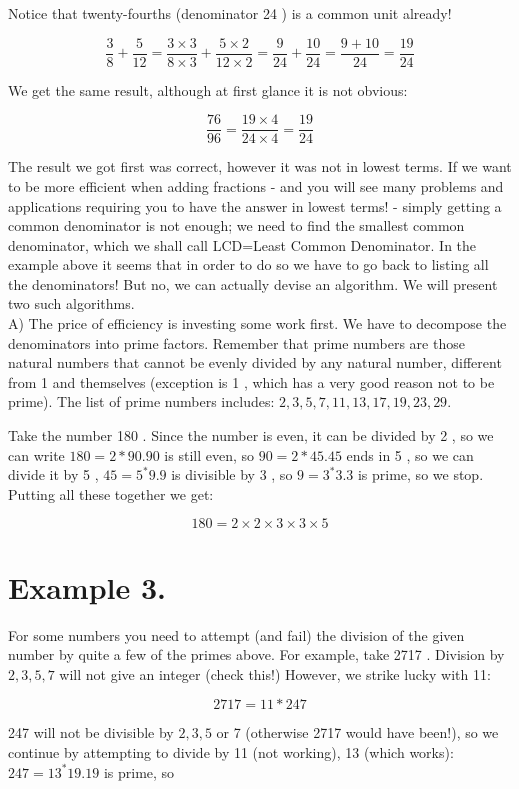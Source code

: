 \documentclass{ximera}
\begin{document}
Notice that twenty-fourths (denominator 24 ) is a common unit already!

$$\frac{3}{8}+\frac{5}{12}=\frac{3 \times 3}{8 \times 3}+\frac{5 \times 2}{12 \times 2}=\frac{9}{24}+\frac{10}{24}=\frac{9+10}{24}=\frac{19}{24}$$

We get the same result, although at first glance it is not obvious:

$$\frac{76}{96}=\frac{19 \times 4}{24 \times 4}=\frac{19}{24}$$

The result we got first was correct, however it was not in lowest terms. If we want to be more efficient when adding fractions - and you will see many problems and applications requiring you to have the answer in lowest terms! - simply getting a common denominator is not enough; we need to find the smallest common denominator, which we shall call LCD=Least Common Denominator. In the example above it seems that in order to do so we have to go back to listing all the denominators! But no, we can actually devise an algorithm. We will present two such algorithms.\\
A) The price of efficiency is investing some work first. We have to decompose the denominators into prime factors. Remember that prime numbers are those natural numbers that cannot be evenly divided by any natural number, different from 1 and themselves (exception is 1 , which has a very good reason not to be prime). The list of prime numbers includes: $2,3,5,7,11,13,17,19,23,29$.

Take the number 180 . Since the number is even, it can be divided by 2 , so we can write $180=2 * 90.90$ is still even, so $90=2 * 45.45$ ends in 5 , so we can divide it by 5 , $45=5^{*} 9.9$ is divisible by 3 , so $9=3^{*} 3.3$ is prime, so we stop. Putting all these together we get:

$$180=2 \times 2 \times 3 \times 3 \times 5$$

\section*{Example 3.}
For some numbers you need to attempt (and fail) the division of the given number by quite a few of the primes above. For example, take 2717 . Division by $2,3,5,7$ will not give an integer (check this!) However, we strike lucky with 11:

$$2717=11 * 247$$

247 will not be divisible by $2,3,5$ or 7 (otherwise 2717 would have been!), so we continue by attempting to divide by 11 (not working), 13 (which works): $247=13^{*} 19.19$ is prime, so
\end{document}
